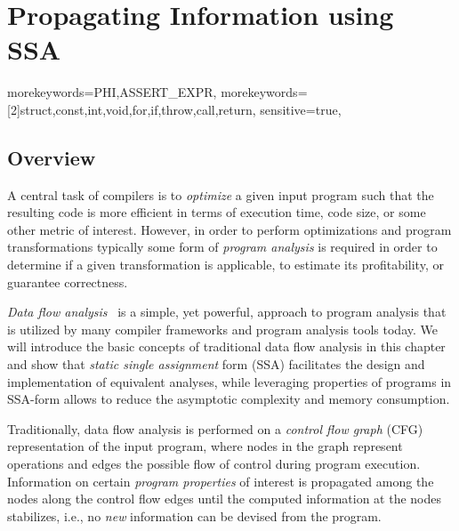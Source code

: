 \providecommand\lcode{\begingroup \small\urlstyle{tt}\Url}
\providecommand\lident{\begingroup \small\urlstyle{tt}\Url}

\chapter{Propagating Information using SSA}

\newcommand{\obacht}[2]{\marginpar{\tiny\textbf{#1:} #2}}

\graphicspath{{img/}{constant_propagation_is_easier/img/}{part3/constant_propagation_is_easier/img/}}

{
  morekeywords={PHI,ASSERT_EXPR},
  morekeywords=[2]{struct,const,int,void,for,if,throw,call,return},
  sensitive=true,
}

\lstset{
  mathescape=true,
  language=DNlisting,
  basicstyle=\small,
  keywordstyle=\ttfamily,
  keywordstyle=[2]\bfseries,
  numbers=left
}

\section{Overview}

A central task of compilers is to \emph{optimize} a given input program such
that the resulting code is more efficient in terms of execution time, code size,
or some other metric of interest. However, in order to perform optimizations and
program transformations typically some form of \emph{program analysis} is
required in order to determine if a given transformation is applicable, to
estimate its profitability, or guarantee correctness.

\emph{Data flow analysis}~\cite{novillo:bib:NNH99} is a simple, yet powerful,
approach to program analysis that is utilized by many compiler frameworks and
program analysis tools today. We will introduce the basic concepts of
traditional data flow analysis in this chapter and show that \emph{static single
assignment} form (SSA) facilitates the design and implementation of equivalent
analyses, while leveraging properties of programs in SSA-form allows to reduce
the asymptotic complexity and memory consumption.

Traditionally, data flow analysis is performed on a \emph{control flow graph}
(CFG) representation of the input program, where nodes in the graph represent
operations and edges the possible flow of control during program execution.
Information on certain \emph{program properties} of interest is propagated among
the nodes along the control flow edges until the computed information at the
nodes stabilizes, i.e., no \emph{new} information can be devised from the
program.

